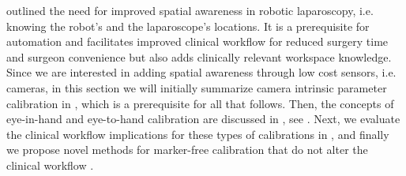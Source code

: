  outlined the need for improved spatial awareness in robotic laparoscopy, i.e. knowing the robot's and the laparoscope's locations. It is a prerequisite for automation and facilitates improved clinical workflow for reduced surgery time and surgeon convenience but also adds clinically relevant workspace knowledge. Since we are interested in adding spatial awareness through low cost sensors, i.e. cameras, in this section we will initially summarize camera intrinsic parameter calibration in , which is a prerequisite for all that follows. Then, the concepts of eye-in-hand and eye-to-hand calibration are discussed in , see . Next, we evaluate the clinical workflow implications for these types of calibrations in , and finally we propose novel methods for marker-free calibration that do not alter the clinical workflow .
\label{in:sec:eye_in_to_hand}

